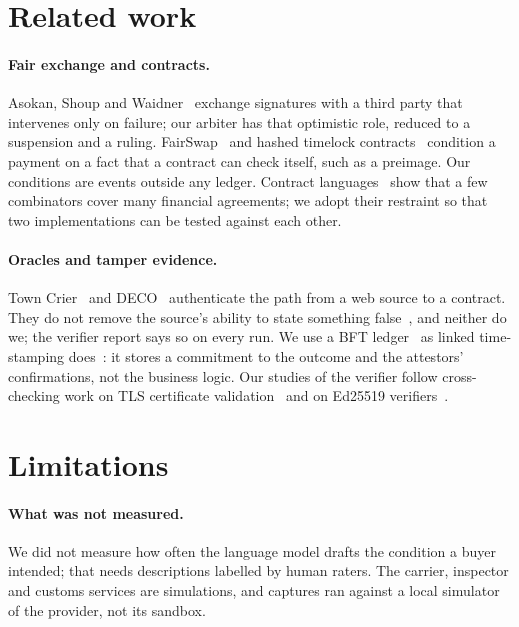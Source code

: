 \documentclass[10pt,a4paper]{article}
\theoremstyle{tight}
\begin{document}
\section{Related work}\label{sec:related}

\paragraph{Fair exchange and contracts.} Asokan, Shoup and Waidner~\cite{asokan2000} exchange signatures with a
third party that intervenes only on failure; our arbiter has that optimistic role, reduced to a suspension and a
ruling. FairSwap~\cite{dziembowski2018} and hashed timelock contracts~\cite{herlihy2018} condition a payment on a fact
that a contract can check itself, such as a preimage. Our conditions are events outside any ledger. Contract
languages~\cite{peytonjones2000,bartoletti2018,lamela2018} show that a few combinators cover many financial
agreements; we adopt their restraint so that two implementations can be tested against each other.

\paragraph{Oracles and tamper evidence.} Town Crier~\cite{zhang2016} and DECO~\cite{zhang2020} authenticate the
path from a web source to a contract. They do not remove the source's ability to state something
false~\cite{caldarelli2020,eskandari2021}, and neither do we; the verifier report says so on every run. We use a BFT
ledger~\cite{buchman2018} as linked time-stamping does~\cite{haber1991}: it stores a commitment to the outcome and
the attestors' confirmations, not the business logic. Our studies of the verifier follow cross-checking work on TLS certificate validation~\cite{brubaker2014} and on
Ed25519 verifiers~\cite{chalkias2020}.



\section{Limitations}\label{sec:limits}

\paragraph{What was not measured.} We did not measure how often the language model drafts the condition a buyer
intended; that needs descriptions labelled by human raters. The carrier, inspector and customs services are
simulations, and captures ran against a local simulator of the provider, not its sandbox.
\end{document}

